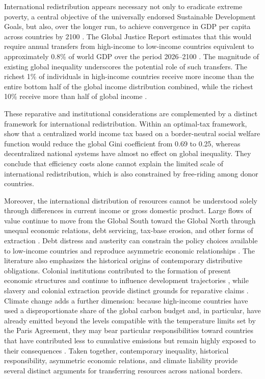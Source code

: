 \documentclass[11pt,a4paper]{article}
\begin{document}
International redistribution appears necessary not only to eradicate extreme poverty, a central objective of the universally endorsed Sustainable Development Goals, but also, over the longer run, to achieve convergence in GDP per capita across countries by 2100 \citep{fabre_JDS_2025}. The Global Justice Report estimates that this would require annual transfers from high-income to low-income countries equivalent to approximately 0.8\% of world GDP over the period 2026--2100 \citep[Figure~4.2]{bothe_et_al_2026}. The magnitude of existing global inequality underscores the potential role of such transfers. The richest 1\% of individuals in high-income countries receive more income than the entire bottom half of the global income distribution combined, while the richest 10\% receive more than half of global income \citep{chancel_world_2026}.

These reparative and institutional considerations are complemented by a distinct framework for international redistribution. Within an optimal-tax framework, \citet{kopczuk_limitations_2005} show that a centralized world income tax based on a border-neutral social welfare function would reduce the global Gini coefficient from 0.69 to 0.25, whereas decentralized national systems have almost no effect on global inequality. They conclude that efficiency costs alone cannot explain the limited scale of international redistribution, which is also constrained by free-riding among donor countries.

Moreover, the international distribution of resources cannot be understood solely through differences in current income or gross domestic product. Large flows of value continue to move from the Global South toward the Global North through unequal economic relations, debt servicing, tax-base erosion, and other forms of extraction \citep{hickel_plunder_2021}. Debt distress and austerity can constrain the policy choices available to low-income countries and reproduce asymmetric economic relationships \citep{fischer_return_2023}. The literature also emphasizes the historical origins of contemporary distributive obligations. Colonial institutions contributed to the formation of present economic structures and continue to influence development trajectories \citep{bhambra_colonial_2021}, while slavery and colonial extraction provide distinct grounds for reparative claims \citep{solbiac_britains_2015,darity_cumulative_2022}. Climate change adds a further dimension: because high-income countries have used a disproportionate share of the global carbon budget and, in particular, have already emitted beyond the levels compatible with the temperature limits set by the Paris Agreement, they may bear particular responsibilities toward countries that have contributed less to cumulative emissions but remain highly exposed to their consequences \citep{fanning_compensation_2023,Hickel_and_Zoomkawala_2026}. Taken together, contemporary inequality, historical responsibility, asymmetric economic relations, and climate liability provide several distinct arguments for transferring resources across national borders.
\end{document}

